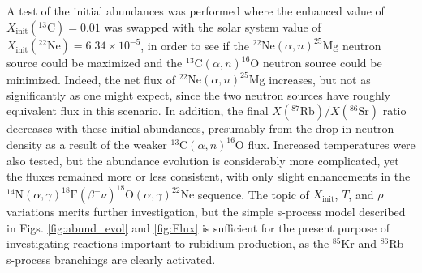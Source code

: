 A test of the initial abundances was performed where the enhanced value of $X_{\mathrm{init}}(^{13}\mathrm{C}) = 0.01$ was swapped with the solar system value of $X_{\mathrm{init}}(^{22}\mathrm{Ne}) = 6.34 \times 10^{-5}$, in order to see if the $^{22}\mathrm{Ne}(\alpha,n)^{25}\mathrm{Mg}$ neutron source could be maximized and the $^{13}\mathrm{C}(\alpha,n)^{16}\mathrm{O}$ neutron source could be minimized. Indeed, the net flux of $^{22}\mathrm{Ne}(\alpha,n)^{25}\mathrm{Mg}$ increases, but not as significantly as one might expect, since the two neutron sources have roughly equivalent flux in this scenario. In addition, the final $X(^{87}\mathrm{Rb})/X(^{86}\mathrm{Sr})$ ratio decreases with these initial abundances, presumably from the drop in neutron density as a result of the weaker $^{13}\mathrm{C}(\alpha,n)^{16}\mathrm{O}$ flux. Increased temperatures were also tested, but the abundance evolution is considerably more complicated, yet the fluxes remained more or less consistent, with only slight enhancements in the $^{14}\mathrm{N}(\alpha,\gamma)^{18}\mathrm{F}(\beta^{+}\nu)^{18}\mathrm{O}(\alpha,\gamma)^{22}\mathrm{Ne}$ sequence. The topic of $X_{\mathrm{init}}$, $T$, and $\rho$ variations merits further investigation, but the simple s-process model described in Figs. \ref{fig:abund_evol} and \ref{fig:Flux} is sufficient for the present purpose of investigating reactions important to rubidium production, as the $^{85}$Kr and $^{86}$Rb s-process branchings are clearly activated.

